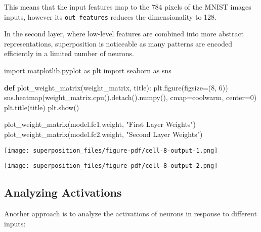 \documentclass[
  letterpaper,
  DIV=11,
  numbers=noendperiod]{scrreprt}
\newenvironment{Shaded}{\begin{snugshade}}{\end{snugshade}}
\newcommand{\DecValTok}[1]{\textcolor[rgb]{0.68,0.00,0.00}{#1}}
\newcommand{\ImportTok}[1]{\textcolor[rgb]{0.00,0.46,0.62}{#1}}
\newcommand{\KeywordTok}[1]{\textcolor[rgb]{0.00,0.23,0.31}{\textbf{#1}}}
\newcommand{\NormalTok}[1]{\textcolor[rgb]{0.00,0.23,0.31}{#1}}
\newcommand{\OperatorTok}[1]{\textcolor[rgb]{0.37,0.37,0.37}{#1}}
\newcommand{\StringTok}[1]{\textcolor[rgb]{0.13,0.47,0.30}{#1}}
\begin{document}
This means that the input features map to the 784 pixels of the MNIST
images inputs, however its \texttt{out\_features} reduces the
dimensionality to 128.

In the second layer, where low-level features are combined into more
abstract representations, superposition is noticeable as many patterns
are encoded efficiently in a limited number of neurons.

\begin{Shaded}
\begin{Highlighting}[]
\ImportTok{import}\NormalTok{ matplotlib.pyplot }\ImportTok{as}\NormalTok{ plt}
\ImportTok{import}\NormalTok{ seaborn }\ImportTok{as}\NormalTok{ sns}

\KeywordTok{def}\NormalTok{ plot\_weight\_matrix(weight\_matrix, title):}
\NormalTok{    plt.figure(figsize}\OperatorTok{=}\NormalTok{(}\DecValTok{8}\NormalTok{, }\DecValTok{6}\NormalTok{))}
\NormalTok{    sns.heatmap(weight\_matrix.cpu().detach().numpy(), cmap}\OperatorTok{=}\StringTok{\textquotesingle{}coolwarm\textquotesingle{}}\NormalTok{, center}\OperatorTok{=}\DecValTok{0}\NormalTok{)}
\NormalTok{    plt.title(title)}
\NormalTok{    plt.show()}

\NormalTok{plot\_weight\_matrix(model.fc1.weight, }\StringTok{"First Layer Weights"}\NormalTok{)}
\NormalTok{plot\_weight\_matrix(model.fc2.weight, }\StringTok{"Second Layer Weights"}\NormalTok{)}
\end{Highlighting}
\end{Shaded}

\texttt{[image: superposition\_files/figure-pdf/cell-8-output-1.png]}

\texttt{[image: superposition\_files/figure-pdf/cell-8-output-2.png]}

\subsection{Analyzing Activations}\label{analyzing-activations}

Another approach is to analyze the activations of neurons in response to
different inputs:
\end{document}
